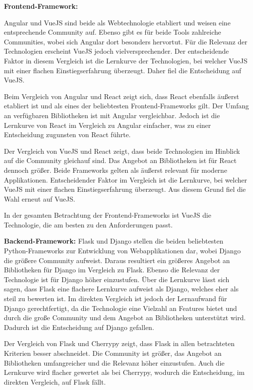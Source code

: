 \textbf{Frontend-Framework:}

Angular und VueJS sind beide als Webtechnologie etabliert und weisen eine entsprechende Community auf.
Ebenso gibt es für beide Tools zahlreiche Communities, wobei sich Angular dort besonders hervortut.
Für die Relevanz der Technologien erscheint VueJS jedoch vielversprechender.
Der entscheidende Faktor in diesem Vergleich ist die Lernkurve der Technologien, bei welcher VueJS mit einer flachen Einstiegserfahrung überzeugt.%
Daher fiel die Entscheidung auf VueJS.

Beim Vergleich von Angular und React zeigt sich, dass React ebenfalls äußerst etabliert ist und als eines der beliebtesten Frontend-Frameworks gilt.%
Der Umfang an verfügbaren Bibliotheken ist mit Angular vergleichbar.
Jedoch ist die Lernkurve von React im Vergleich zu Angular einfacher, was zu einer Entscheidung zugunsten von React führte.%

Der Vergleich von VueJS und React zeigt, dass beide Technologien im Hinblick auf die Community gleichauf sind.%
Das Angebot an Bibliotheken ist für React dennoch größer.%
Beide Frameworks gelten als äußerst relevant für moderne Applikationen.%
Entscheidender Faktor im Vergleich ist die Lernkurve, bei welcher VueJS mit einer flachen Einstiegserfahrung überzeugt.%
Aus diesem Grund fiel die Wahl erneut auf VueJS.

In der gesamten Betrachtung der Frontend-Frameworks ist VueJS die Technologie, die am besten zu den Anforderungen passt.

\textbf{Backend-Framework:}
Flask und Django stellen die beiden beliebtesten Python-Frameworks zur Entwicklung von Webapplikationen dar, wobei Django die größere Community aufweist.%
Daraus resultiert ein größeres Angebot an Bibliotheken für Django im Vergleich zu Flask. %
Ebenso die Relevanz der Technologie ist für Django höher einzustufen.%
Über die Lernkurve lässt sich sagen, dass Flask eine flachere Lernkurve aufweist als Django, welches eher als steil zu bewerten ist.%
Im direkten Vergleich ist jedoch der Lernaufwand für Django gerechtfertigt, da die Technologie eine Vielzahl an Features bietet und durch die große Community und dem Angebot an Bibliotheken unterstützt wird.
Dadurch ist die Entscheidung auf Django gefallen.

Der Vergleich von Flask und Cherrypy zeigt, dass Flask in allen betrachteten Kriterien besser abschneidet.
Die Community ist größer, das Angebot an Bibliotheken umfangreicher und die Relevanz höher einzustufen.%
Auch die Lernkurve wird flacher gewertet als bei Cherrypy, wodurch die Entscheidung, im direkten Vergleich, auf Flask fällt.%

